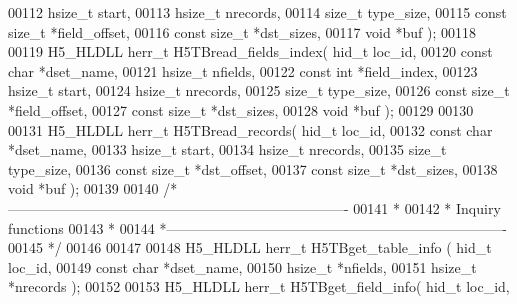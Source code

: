 \begin{DoxyCode}
00112                              hsize\_t start,
00113                              hsize\_t nrecords,
00114                              \textcolor{keywordtype}{size\_t} type\_size,
00115                              \textcolor{keyword}{const} \textcolor{keywordtype}{size\_t} *field\_offset,
00116                              \textcolor{keyword}{const} \textcolor{keywordtype}{size\_t} *dst\_sizes,
00117                              \textcolor{keywordtype}{void} *buf );
00118 
00119 H5\_HLDLL herr\_t  H5TBread\_fields\_index( hid\_t loc\_id,
00120                               \textcolor{keyword}{const} \textcolor{keywordtype}{char} *dset\_name,
00121                               hsize\_t nfields,
00122                               \textcolor{keyword}{const} \textcolor{keywordtype}{int} *field\_index,
00123                               hsize\_t start,
00124                               hsize\_t nrecords,
00125                               \textcolor{keywordtype}{size\_t} type\_size,
00126                               \textcolor{keyword}{const} \textcolor{keywordtype}{size\_t} *field\_offset,
00127                               \textcolor{keyword}{const} \textcolor{keywordtype}{size\_t} *dst\_sizes,
00128                               \textcolor{keywordtype}{void} *buf );
00129 
00130 
00131 H5\_HLDLL herr\_t  H5TBread\_records( hid\_t loc\_id,
00132                          \textcolor{keyword}{const} \textcolor{keywordtype}{char} *dset\_name,
00133                          hsize\_t start,
00134                          hsize\_t nrecords,
00135                          \textcolor{keywordtype}{size\_t} type\_size,
00136                          \textcolor{keyword}{const} \textcolor{keywordtype}{size\_t} *dst\_offset,
00137                          \textcolor{keyword}{const} \textcolor{keywordtype}{size\_t} *dst\_sizes,
00138                          \textcolor{keywordtype}{void} *buf );
00139 
00140 \textcolor{comment}{/*-------------------------------------------------------------------------}
00141 \textcolor{comment}{ *}
00142 \textcolor{comment}{ * Inquiry functions}
00143 \textcolor{comment}{ *}
00144 \textcolor{comment}{ *-------------------------------------------------------------------------}
00145 \textcolor{comment}{ */}
00146 
00147 
00148 H5\_HLDLL herr\_t  H5TBget\_table\_info ( hid\_t loc\_id,
00149                             \textcolor{keyword}{const} \textcolor{keywordtype}{char} *dset\_name,
00150                             hsize\_t *nfields,
00151                             hsize\_t *nrecords );
00152 
00153 H5\_HLDLL herr\_t  H5TBget\_field\_info( hid\_t loc\_id,

\end{DoxyCode}
